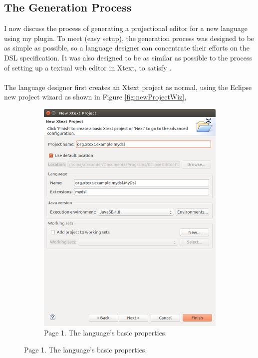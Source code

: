 \documentclass{article}
\begin{document}
\subsection{The Generation Process}
I now discuss the process of generating a projectional editor for a new language using my plugin. To meet \RSetup (easy setup), the generation process was designed to be as simple as possible, so a language designer can concentrate their efforts on the DSL specification. It was also designed to be as similar as possible to the process of setting up a textual web editor in Xtext, to satisfy \RFamiliarity.
\\
\\
The language designer first creates an Xtext project as normal, using the Eclipse new project wizard as shown in Figure \ref{fig:newProjectWiz},
\begin{figure}[t!]
  \centering
  \begin{subfigure}[b]{0.45\linewidth}
    \includegraphics[width=\linewidth]{./Screenshots/newXtextProject.png}
    \caption{Page 1. The language's basic properties.}

\end{subfigure}
\end{figure}
\end{document}
